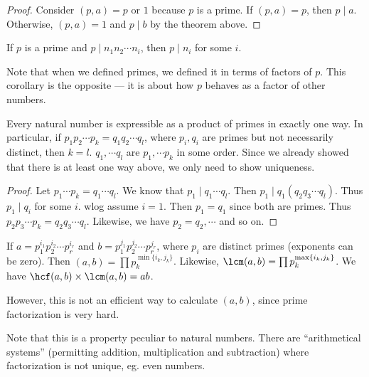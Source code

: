 \documentclass[a4paper]{article}
\begin{document}
\begin{proof}
  Consider $(p, a) = p$ or $1$ because $p$ is a prime. If $(p, a) = p$, then $p \mid a$. Otherwise, $(p, a) = 1$ and $p \mid b$ by the theorem above.
\end{proof}

\begin{cor}
  If $p$ is a prime and $p\mid n_1n_2\cdots n_i$, then $p \mid n_i$ for some $i$.
\end{cor}
Note that when we defined primes, we defined it in terms of factors of $p$. This corollary is the opposite --- it is about how $p$ behaves as a factor of other numbers.

\begin{thm}
  Every natural number is expressible as a product of primes in exactly one way. In particular, if $p_1p_2\cdots p_k = q_1q_2\cdots q_l$, where $p_i, q_i$ are primes but not necessarily distinct, then $k = l$. $q_1, \cdots q_l$ are $p_1, \cdots p_k$ in some order. Since we already showed that there is at least one way above, we only need to show uniqueness.
\end{thm}

\begin{proof}
  Let $p_1\cdots p_k = q_1\cdots q_l$. We know that $p_1 \mid q_1\cdots q_l$. Then $p_1 \mid q_1(q_2q_3\cdots q_l)$. Thus $p_1 \mid q_i$ for some $i$. wlog assume $i = 1$. Then $p_1 = q_1$ since both are primes. Thus $p_2p_3 \cdots p_k = q_2q_3\cdots q_l$. Likewise, we have $p_2 = q_2, \cdots$ and so on.
\end{proof}

\begin{cor}
  If $a = p_1^{i_1}p_2^{i_2}\cdots p_r^{i_r}$ and $b = p_1^{j_1}p_2^{j_2}\cdots p_r^{j_r}$, where $p_i$ are distinct primes (exponents can be zero). Then $(a, b)=\prod p_k^{\min\{i_k, j_k\}}$. Likewise, $\lcm(a, b) = \prod p_k^{\max\{i_k, j_k\}}$. We have $\hcf(a, b)\times\lcm(a, b) = ab$.
\end{cor}
However, this is not an efficient way to calculate $(a, b)$, since prime factorization is very hard.

Note that this is a property peculiar to natural numbers. There are ``arithmetical systems'' (permitting addition, multiplication and subtraction) where factorization is not unique, eg. even numbers.
\end{document}
